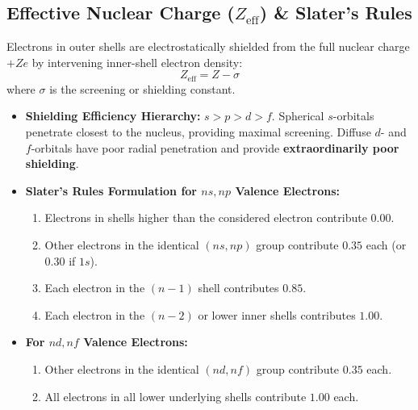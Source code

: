 \documentclass[10pt,a4paper]{article}
\begin{document}
\subsection{Effective Nuclear Charge ($Z_{\text{eff}}$) \& Slater's Rules}
Electrons in outer shells are electrostatically shielded from the full nuclear charge $+Ze$ by intervening inner-shell electron density:
\begin{equation}
  Z_{\text{eff}} = Z - \sigma
\end{equation}
where $\sigma$ is the screening or shielding constant.
\begin{itemize}
  \item \textbf{Shielding Efficiency Hierarchy:} $s > p > d > f$.
  Spherical $s$-orbitals penetrate closest to the nucleus, providing maximal screening. Diffuse $d$- and $f$-orbitals have poor radial penetration and provide \textbf{extraordinarily poor shielding}.
  \item \textbf{Slater's Rules Formulation for $ns, np$ Valence Electrons:}
  \begin{enumerate}
    \item Electrons in shells higher than the considered electron contribute $0.00$.
    \item Other electrons in the identical $(ns, np)$ group contribute $0.35$ each (or $0.30$ if $1s$).
    \item Each electron in the $(n - 1)$ shell contributes $0.85$.
    \item Each electron in the $(n - 2)$ or lower inner shells contributes $1.00$.
  \end{enumerate}
  \item \textbf{For $nd, nf$ Valence Electrons:}
  \begin{enumerate}
    \item Other electrons in the identical $(nd, nf)$ group contribute $0.35$ each.
    \item All electrons in all lower underlying shells contribute $1.00$ each.
  \end{enumerate}
\end{itemize}
\end{document}
